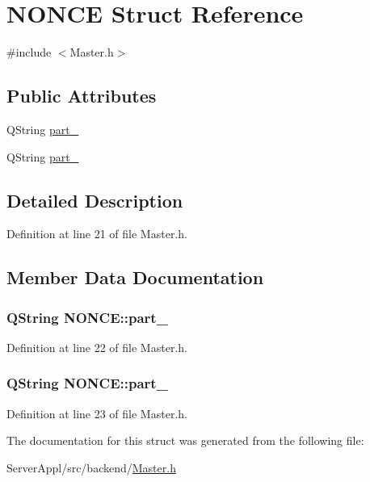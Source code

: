 \hypertarget{struct_n_o_n_c_e}{}\section{N\+O\+N\+C\+E Struct Reference}
\label{struct_n_o_n_c_e}


{\ttfamily \#include $<$Master.\+h$>$}

\subsection*{Public Attributes}
\begin{DoxyCompactItemize}
\item 
Q\+String \hyperlink{struct_n_o_n_c_e_ae9b73f4d7d40935be63c66418782b0bf}{part\+\_}
\item 
Q\+String \hyperlink{struct_n_o_n_c_e_ab1d86a6c128498feafc3e72302904e83}{part\+\_}
\end{DoxyCompactItemize}


\subsection{Detailed Description}


Definition at line 21 of file Master.\+h.



\subsection{Member Data Documentation}
\hypertarget{struct_n_o_n_c_e_ae9b73f4d7d40935be63c66418782b0bf}{}
\subsubsection[{part\+\_\+1}]{\setlength{\rightskip}{0pt plus 5cm}Q\+String N\+O\+N\+C\+E\+::part\+\_}\label{struct_n_o_n_c_e_ae9b73f4d7d40935be63c66418782b0bf}


Definition at line 22 of file Master.\+h.

\hypertarget{struct_n_o_n_c_e_ab1d86a6c128498feafc3e72302904e83}{}
\subsubsection[{part\+\_\+2}]{\setlength{\rightskip}{0pt plus 5cm}Q\+String N\+O\+N\+C\+E\+::part\+\_}\label{struct_n_o_n_c_e_ab1d86a6c128498feafc3e72302904e83}


Definition at line 23 of file Master.\+h.



The documentation for this struct was generated from the following file\+:\begin{DoxyCompactItemize}
\item 
Server\+Appl/src/backend/\hyperlink{_master_8h}{Master.\+h}\end{DoxyCompactItemize}
